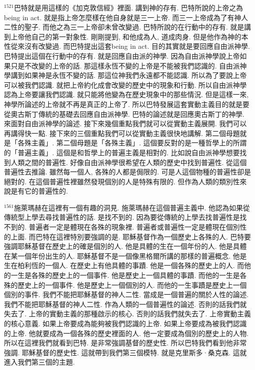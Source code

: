 \documentclass{book}
\begin{document}
$^{1521}$巴特就是用這樣的《加克敦信經》裡面.
講到神的存有.
巴特所說的上帝之為being in act.
就是指上帝怎麼樣在他自身就是三一上帝.
而三一上帝成為了有神人二性的聖子.
而他之為三一上帝卻未曾改變過.
巴特所說的在行動中的存有.
就是講到上帝他自己的第一對象性.
剛剛提到, 和他成為人, 道成肉身.
但是他作為神的本性從來沒有改變過.
而巴特提出這套being in act.
目的其實就是要回應自由派神學.
巴特提出這個在行動中的存有.
就是回應自由派的神學.
因為自由派神學說上帝如果只是不改變的上帝的話.
那這樣永恆不變的上帝是不能被我們認識的.
自由派神學講到如果神是永恆不變的話.
那這位神我們永遠都不能認識.
所以為了要說上帝可以被我們認識.
就把上帝約化成會改變的歷史中的現象和行動.
所以自由派神學認為上帝要讓我們認識.
就只能將他變為在歷史現象中的那些情況.
但是這樣一來, 神學所論述的上帝就不再是真正的上帝了.
所以巴特發展這套實動主義目的就是要從奧古斯丁傳統的基礎去回應自由派神學.
巴特的論述就是回應奧古斯丁的神學.
來面對自由派神學的論述.
接下來幾個重點我們就可以從實動主義展開.
我們可以再講得快一點.
接下來的三個重點我們可以從實動主義很快地講解.
第二個母題就是「各殊主義」.
第二個母題是「各殊主義」.
這個要反對的是一種哲學上的所謂的「普遍主義」.
這個是和哲學上的普遍主義是相對的.
比如說自由派神學想要找到人類之間的普遍性.
好像自由派神學很希望在人類的歷史中找到普遍性.
從這個普遍性去推論.
雖然每一個人, 各殊的人都是侷限的.
可是人這個物種的普遍性卻是絕對的.
在這個普遍性裡雖然發現個別的人是特殊有限的.
但作為人類的類別性來說是有它的普遍性的.

$^{1561}$施萊瑪赫在這裡有一個有趣的洞見.
施萊瑪赫在這個普遍主義中.
他認為如果從傳統型上學去尋找普遍性的話.
是找不到的.
因為要從傳統的上學去找普遍性是找不到的.
普遍者一定是體現在各殊的現象裡.
普遍者或普遍性一定是體現在個別性的上面.
而巴特在這裡特別要強調的是.
耶穌基督作為一個歷史上各殊的人.
巴特要強調耶穌基督在歷史上的確是個別的人.
他是具體的生在一個年份的人.
他是具體在某一個年份出生的人.
耶穌基督不是一個像黑格爾所講的那樣的普遍概念.
他是生在柏利恆的一個人.
在歷史上有他具體的事蹟.
他是一個各殊的歷史上的人.
而他的一生是各殊的歷史上的一個事件.
他是歷史上一個具體的事蹟.
而他的一生是各殊的歷史上的一個事件.
他是歷史上一個個別的人.
而他的一生事蹟是歷史上一個個別的事件.
我們不能把耶穌基督的神人二性.
當成是一個普遍的關於人性的論述.
我們不能把耶穌基督的神人二性.
作為人類的一個普遍性的論述.
否則的話我們就失去了.
上帝的實動主義的那種啟示的核心.
否則的話我們就失去了.
上帝實動主義的核心意義.
如果上帝要成為能夠被我們認識的上帝.
如果上帝要成為被我們認識的上帝.
他就要成為一個各殊的歷史裡面的人.
他一定要成為個別的歷史上的人物.
所以在這裡我們就看到巴特.
是非常強調基督的歷史性.
所以巴特我們看到他非常強調.
耶穌基督的歷史性.
這就帶到我們第三個模特.
就是克里斯多·桑克森.
這就進入我們第三個的主題.
\end{document}
